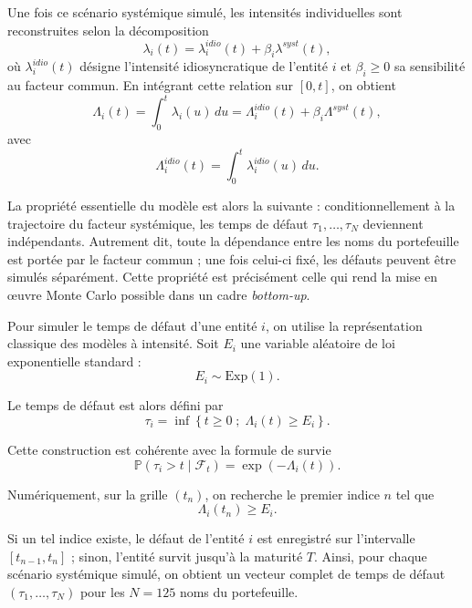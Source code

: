 Une fois ce scénario systémique simulé, les intensités individuelles sont reconstruites selon la décomposition
\begin{equation}
\lambda_i(t)=\lambda_i^{idio}(t)+\beta_i\lambda^{syst}(t),
\end{equation}
où $\lambda_i^{idio}(t)$ désigne l'intensité idiosyncratique de l'entité $i$ et $\beta_i \geq 0$ sa sensibilité au facteur commun. En intégrant cette relation sur $[0,t]$, on obtient
\begin{equation}
\Lambda_i(t)=\int_0^t \lambda_i(u)\,du
=
\Lambda_i^{idio}(t)+\beta_i\Lambda^{syst}(t),
\end{equation}
avec
\begin{equation}
\Lambda_i^{idio}(t)=\int_0^t \lambda_i^{idio}(u)\,du.
\end{equation}

La propriété essentielle du modèle est alors la suivante : conditionnellement à la trajectoire du facteur systémique, les temps de défaut $\tau_1,\dots,\tau_N$ deviennent indépendants. Autrement dit, toute la dépendance entre les noms du portefeuille est portée par le facteur commun ; une fois celui-ci fixé, les défauts peuvent être simulés séparément. Cette propriété est précisément celle qui rend la mise en œuvre Monte Carlo possible dans un cadre \textit{bottom-up}.

Pour simuler le temps de défaut d'une entité $i$, on utilise la représentation classique des modèles à intensité. Soit $E_i$ une variable aléatoire de loi exponentielle standard :
\begin{equation}
E_i \sim \mathrm{Exp}(1).
\end{equation}

Le temps de défaut est alors défini par
\begin{equation}
\tau_i=\inf\left\{t\geq 0 \; ; \; \Lambda_i(t)\geq E_i\right\}.
\end{equation}

Cette construction est cohérente avec la formule de survie
\begin{equation}
\mathbb{P}(\tau_i>t \mid \mathcal{F}_t)=\exp\left(-\Lambda_i(t)\right).
\end{equation}

Numériquement, sur la grille $(t_n)$, on recherche le premier indice $n$ tel que
\begin{equation}
\Lambda_i(t_n)\geq E_i.
\end{equation}

Si un tel indice existe, le défaut de l'entité $i$ est enregistré sur l'intervalle $[t_{n-1},t_n]$ ; sinon, l'entité survit jusqu'à la maturité $T$. Ainsi, pour chaque scénario systémique simulé, on obtient un vecteur complet de temps de défaut $(\tau_1,\dots,\tau_N)$ pour les $N=125$ noms du portefeuille.

